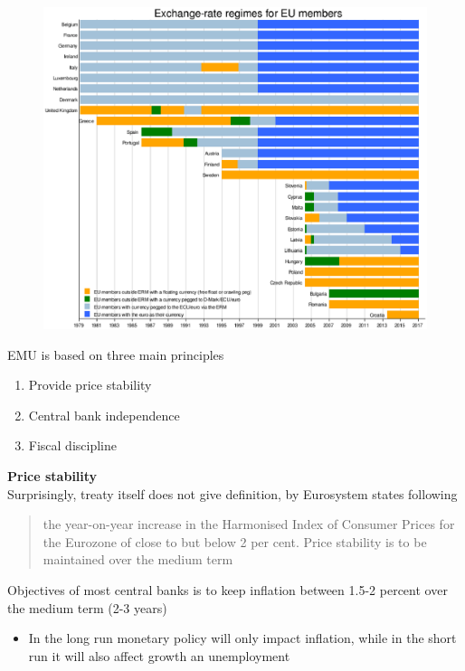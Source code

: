 \documentclass{beamer}
\begin{document}
\begin{frame}
  \begin{figure}
    \includegraphics[scale=.3]{erm.eps}
  \end{figure}
\end{frame}

\begin{frame}
  EMU is based on three main principles
  \begin{enumerate}
    \item Provide price stability
    \item Central bank independence
    \item Fiscal discipline  
\end{enumerate}
\end{frame}

\begin{frame}
  \textbf{Price stability}\\
  Surprisingly, treaty itself does not give definition, by Eurosystem states following
  \begin{quote}
    the year-on-year increase in the Harmonised Index of Consumer Prices for the Eurozone of close to but below 2 per cent. Price stability is to be maintained over the medium term 
  \end{quote}
   \medskip
   Objectives of most central banks is to keep inflation between 1.5-2 percent over the medium term (2-3 years)
   \begin{itemize}
     \item In the long run monetary policy will only impact inflation, while in the short run it will also affect growth an unemployment 
   \end{itemize}
\end{frame}
\end{document}
